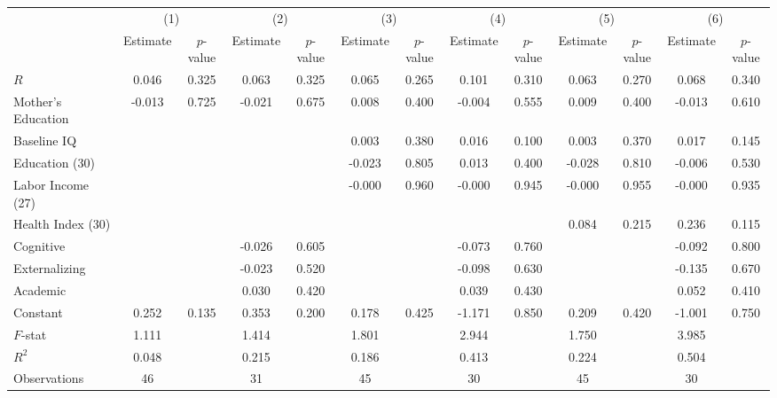 \begin{table}[htbp]
\begin{tabular}{lcccccccccccc} \toprule
 & \multicolumn{2}{c}{(1)}  &  \multicolumn{2}{c}{(2)}  &  \multicolumn{2}{c}{(3)}  &  \multicolumn{2}{c}{(4)}  & \multicolumn{2}{c}{(5)} & \multicolumn{2}{c}{(6)} \\  
 & Estimate & $p$-value & Estimate & $p$-value & Estimate & $p$-value & Estimate & $p$-value & Estimate & $p$-value & Estimate & $p$-value \\ \midrule
$R$ &     0.046 &     0.325 &     0.063 &     0.325 &     0.065 &     0.265 &     0.101 &     0.310 &     0.063 &     0.270 &     0.068 &     0.340 \\  
Mother's Education &    -0.013 &     0.725 &    -0.021 &     0.675 &     0.008 &     0.400 &    -0.004 &     0.555 &     0.009 &     0.400 &    -0.013 &     0.610 \\  
Baseline IQ &          &         &         &         &     0.003 &     0.380 &     0.016 &     0.100 &     0.003 &     0.370 &     0.017 &     0.145 \\  
Education (30) &          &         &         &         &    -0.023 &     0.805 &     0.013 &     0.400 &    -0.028 &     0.810 &    -0.006 &     0.530 \\  
Labor Income (27) &         &         &         &         &    -0.000 &     0.960 &    -0.000 &     0.945 &    -0.000 &     0.955 &    -0.000 &     0.935 \\  
Health Index (30) &         &         &         &         &         &         &         &         &     0.084 &     0.215 &     0.236 &     0.115 \\  
Cognitive &         &         &    -0.026 &     0.605 &         &         &    -0.073 &     0.760 &         &         &    -0.092 &     0.800 \\  
Externalizing &         &         &    -0.023 &     0.520 &         &         &    -0.098 &     0.630 &         &         &    -0.135 &     0.670 \\  
Academic &         &         &     0.030 &     0.420 &         &         &     0.039 &     0.430 &         &         &     0.052 &     0.410 \\  
Constant &     0.252 &     0.135 &     0.353 &     0.200 &     0.178 &     0.425 &    -1.171 &     0.850 &     0.209 &     0.420 &    -1.001 &     0.750 \\  \midrule
$F$-stat &     1.111 &         &     1.414 &         &     1.801 &         &     2.944 &         &     1.750 &         &     3.985 &         \\  
$R^2$ &     0.048 &         &     0.215 &         &     0.186 &         &     0.413 &         &     0.224 &         &     0.504 &         \\  
Observations &    46 &         &    31&         &    45 &         &    30 &         &    45 &         &    30 &         \\  
\bottomrule \end{tabular}
\end{table}
